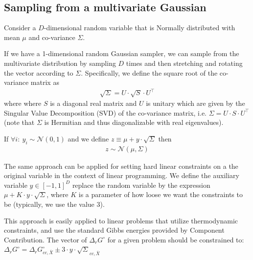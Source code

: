 \documentclass[twocolumn]{article}
\begin{document}
\subsection{Sampling from a multivariate Gaussian}\label{sec:multivariate}
Consider a $D$-dimensional random variable that is Normally distributed with mean $\mu$ and co-variance $\Sigma$.

If we have a 1-dimensional random Gaussian sampler, we can sample from the multivariate distribution by sampling $D$ times and then stretching and rotating the vector according to $\Sigma$. Specifically, we define the square root of the co-variance matrix as
\begin{eqnarray}
	\sqrt{\Sigma} = U \cdot \sqrt{S} \cdot U^\top
\end{eqnarray}
where where $S$ is a diagonal real matrix and $U$ is unitary which are given by the Singular Value Decomposition (SVD) of the co-variance matrix, i.e. $\Sigma = U \cdot S \cdot U^\top$ (note that $\Sigma$ is Hermitian and thus diagonalizable with real eigenvalues).

If $\forall i :~ y_i \sim \mathcal{N}(0, 1)$ and we define $z \equiv \mu + y \cdot \sqrt{\Sigma}$ then
\begin{eqnarray}
z \sim \mathcal{N}(\mu, \Sigma)
\end{eqnarray}

The same approach can be applied for setting hard linear constraints on a the original variable in the context of linear programming. We define the auxiliary variable $y \in [-1, 1]^D$ replace the random variable by the expression $\mu + K \cdot y \cdot \sqrt{\Sigma}$, where $K$ is a parameter of how loose we want the constraints to be (typically, we use the value $3$).

This approach is easily applied to linear problems that utilize thermodynamic constraints, and use the standard Gibbs energies provided by Component Contribution. The vector of $\Delta_{r}G^{\circ}$ for a given problem should be constrained to:
$\Delta_{r}G^{\circ} = \Delta_{r}G_{cc,\bar{X}}^{\circ} \pm 3 \cdot y \cdot \sqrt{\Sigma}_{cc,\bar{X}}$



\end{document}

